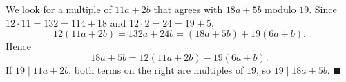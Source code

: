 We look for a multiple of $11a+2b$ that agrees with $18a+5b$ modulo $19$. Since $12\cdot11=132=114+18$ and $12\cdot2=24=19+5$,
\[
12(11a+2b)=132a+24b=(18a+5b)+19(6a+b).
\]
Hence
\[
18a+5b=12(11a+2b)-19(6a+b).
\]
If $19\mid 11a+2b$, both terms on the right are multiples of $19$, so $19\mid18a+5b$. $\blacksquare$
